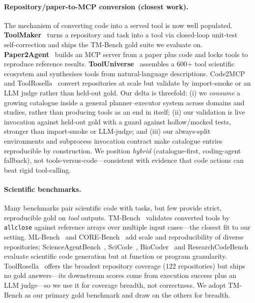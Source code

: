 \paragraph{Repository/paper-to-MCP conversion (closest work).}
The mechanism of converting code into a served tool is now well populated.
\textbf{ToolMaker}~\citep{wolflein2025toolmaker_acl} turns a repository and task
into a tool via closed-loop unit-test self-correction and ships the TM-Bench
gold suite we evaluate on. \textbf{Paper2Agent}~\citep{miao2025paper2agent}
builds an MCP server from a paper plus code and locks tools to reproduce
reference results. \textbf{ToolUniverse}~\citep{gao2025tooluniverse} assembles a
600+ tool scientific ecosystem and synthesises tools from natural-language
descriptions. Code2MCP~\citep{code2mcp2025} and
ToolRosella~\citep{toolrosella2026} convert repositories at scale but validate by
import-smoke or an LLM judge rather than held-out gold. Our delta is threefold:
(i) we \emph{consume} a growing catalogue inside a general planner--executor
system across domains and studies, rather than producing tools as an end in
itself; (ii) our validation is live invocation against held-out gold with a
guard against hollow/mocked tests, stronger than import-smoke or LLM-judge; and
(iii) our always-split environments and subprocess invocation contract make
catalogue entries reproducible by construction. We position \emph{hybrid}
(catalogue-first, coding-agent fallback), not tools-versus-code---consistent with
evidence that code actions can beat rigid tool-calling.

\paragraph{Scientific benchmarks.}
Many benchmarks pair scientific code with tasks, but few provide strict,
reproducible gold on \emph{tool} outputs. TM-Bench~\citep{wolflein2025toolmaker_acl}
validates converted tools by \texttt{allclose} against reference arrays over
multiple input cases---the closest fit to our setting. ML-Bench~\citep{tang2024mlbench}
and CORE-Bench~\citep{corebench2024} add scale and reproducibility of diverse
repositories; ScienceAgentBench~\citep{chen2025scienceagentbench},
SciCode~\citep{tian2024scicode}, BioCoder~\citep{tang2024biocoder} and
ResearchCodeBench evaluate scientific code generation but at function or program
granularity. ToolRosella~\citep{toolrosella2026} offers the broadest repository
coverage (122 repositories) but ships no gold answers---its downstream scores
come from execution success plus an LLM judge---so we use it for coverage
breadth, not correctness. We adopt TM-Bench as our primary gold benchmark and
draw on the others for breadth.
